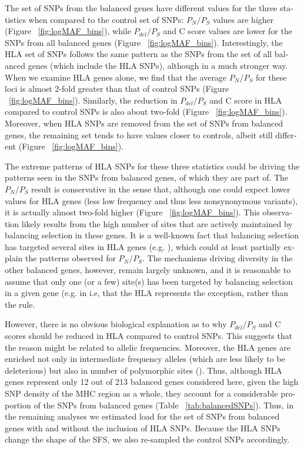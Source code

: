 \begin{refsection}
\begin{otherlanguage}{english}
The set of SNPs from the balanced genes have different values for the three statistics when compared to the control set of SNPs: $P_{N}/P_{S}$ values are higher (Figure ~\ref{fig:logMAF_bins}), while $P_{del}/P_{S}$ and C score values are lower for the SNPs from all balanced genes (Figure ~\ref{fig:logMAF_bins}). Interestingly, the HLA set of SNPs follows the same pattern as the SNPs from the set of all balanced genes  (which include the HLA SNPs), although in a much stronger way. When we examine HLA genes alone, we find that the average  $P_{N}/P_{S}$ for these loci is almost 2-fold greater than that of control SNPs (Figure ~\ref{fig:logMAF_bins}). Similarly, the reduction in $P_{del}/P_{S}$ and C score in HLA compared to control SNPs is also about two-fold (Figure ~\ref{fig:logMAF_bins}). Moreover, when HLA SNPs are removed from the set of SNPs from balanced genes, the remaining set tends to have values closer to controls, albeit still different (Figure ~\ref{fig:logMAF_bins}).

The extreme patterns of HLA SNPs for these three statistics could be driving the patterns seen in the SNPs from balanced genes, of which they are part of. The $P_{N}/P_{S}$ result is conservative in the sense that, although one could expect lower values for HLA genes (less low frequency and thus less nonsynonymous variants), it is actually almost two-fold higher (Figure ~\ref{fig:logMAF_bins}). This observation likely results from the   high number of sites that are actively maintained by balancing selection in these genes. It is a well-known fact that balancing selection has targeted several sites in HLA genes (e.g. \cite{Hughes1988,Yang2002a,Bitarello2015}), which could at least partially explain the patterns observed for $P_{N}/P_{S}$. The mechanisms driving diversity in the other balanced genes, however, remain largely unknown, and it is reasonable to assume that only one (or a few) site(s) has been targeted by balancing selection in a given gene (e.g. in \cite{Leffler2013a} i.e, that the HLA represents the exception, rather than the rule. 

However, there is no obvious biological explanation as to why $P_{del}/P_{S}$ and C scores should be reduced in HLA compared to control SNPs. This suggests that the reason might be related to allelic frequencies. Moreover, the HLA genes are enriched  not only in intermediate frequency alleles (which are less likely to be deleterious) but also in number of polymorphic sites (\cite{Robinson2013}). Thus, although  HLA genes represent only 12 out of 213 balanced genes considered here, given the high SNP density of the MHC region as a whole, they account for a considerable proportion of the SNPs from balanced genes (Table ~\ref{tab:balancedSNPs}). Thus, in the remaining analyses we estimated load for the set of SNPs from balanced genes with and without the inclusion of HLA SNPs. Because the HLA SNPs change the shape of the SFS, we also re-sampled the control SNPs accordingly.



\end{otherlanguage}
\end{refsection}

